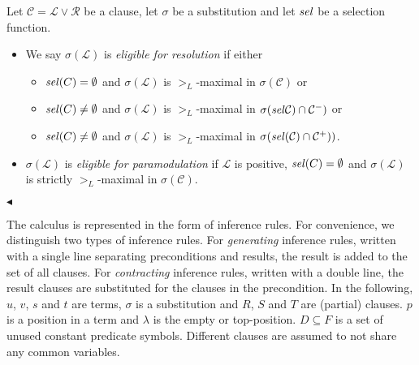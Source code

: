 \documentclass{article}
\begin{document}
\begin{definition}
 \label{def:basics:inferences:eligible}
 Let $\mathcal{C} = \mathcal{L} \vee \mathcal{R}$ be a clause, let
 $\sigma$ be a substitution and let $\mathit{sel}$ be a selection
 function. 
 \begin{itemize}
 \item We say $\sigma(\mathcal{L})$ is \emph{eligible for
     resolution} if either
   \begin{itemize}
   \item $\mathit{sel}(C) = \emptyset$ and $\sigma(\mathcal{L})$ is
     $>_L$-maximal in $\sigma(\mathcal{C})$ or
   \item $\mathit{sel}(C) \not= \emptyset$ and $\sigma(\mathcal{L})$ is
     $>_L$-maximal in $\sigma(\mathit{sel}\mathcal{C})\cap \mathcal{C^-})$
     or
   \item $\mathit{sel}(C) \not= \emptyset$ and $\sigma(\mathcal{L})$ is
     $>_L$-maximal in $\sigma(\mathit{sel}(\mathcal{C})\cap
     \mathcal{C^+}))$.
   \end{itemize} 
 \item $\sigma(\mathcal{L})$ is \emph{eligible for paramodulation} if
   $\mathcal{L}$ is positive, $\mathit{sel}(C) = \emptyset$ and
   $\sigma(\mathcal{L})$ is strictly $>_L$-maximal in
   $\sigma(\mathcal{C})$.
 \end{itemize}
 \hfill$\blacktriangleleft$
\end{definition}


The calculus is represented in the form of inference rules. For
convenience, we distinguish two types of inference rules. For
\emph{generating} inference rules, written with a single line
separating preconditions and results, the result is added to the set
of all clauses. For \emph{contracting} inference rules, written with a
double line, the result clauses are substituted for the clauses in the
precondition. In the following, $u$, $v$, $s$ and $t$ are terms,
$\sigma$ is a substitution and $R$, $S$ and $T$ are (partial) clauses.
$p$ is a position in a term and $\lambda$ is the empty or
top-position. $D \subseteq F$ is a set of unused constant predicate
symbols. Different clauses are assumed to not share any common
variables.
\end{document}
